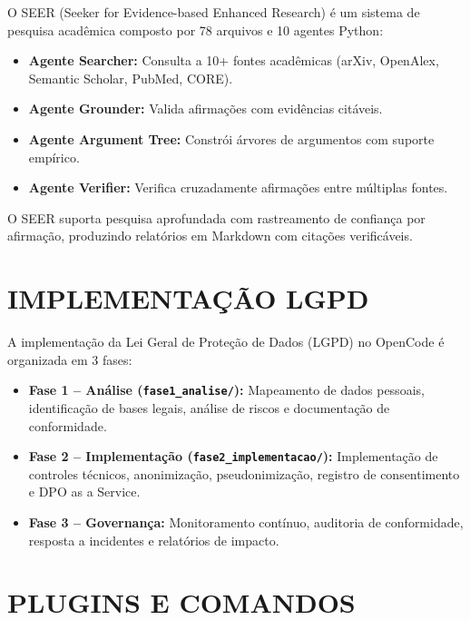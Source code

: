 \documentclass[
  brazil,
  sumario=tradicional,
  10pt
]{abntex2}
\begin{document}
O SEER (Seeker for Evidence-based Enhanced Research) é um sistema
de pesquisa acadêmica composto por 78 arquivos e 10 agentes Python:

\begin{itemize}
  \item \textbf{Agente Searcher:} Consulta a 10+ fontes acadêmicas
    (arXiv, OpenAlex, Semantic Scholar, PubMed, CORE).
  \item \textbf{Agente Grounder:} Valida afirmações com evidências
    citáveis.
  \item \textbf{Agente Argument Tree:} Constrói árvores de argumentos
    com suporte empírico.
  \item \textbf{Agente Verifier:} Verifica cruzadamente afirmações
    entre múltiplas fontes.
\end{itemize}

O SEER suporta pesquisa aprofundada com rastreamento de confiança
por afirmação, produzindo relatórios em Markdown com citações
verificáveis.

\section{IMPLEMENTAÇÃO LGPD}
\label{sec:lgpd}

A implementação da Lei Geral de Proteção de Dados (LGPD) no
OpenCode é organizada em 3 fases:

\begin{itemize}
  \item \textbf{Fase 1 -- Análise (\texttt{fase1\_analise/}):}
    Mapeamento de dados pessoais, identificação de bases legais,
    análise de riscos e documentação de conformidade.
  \item \textbf{Fase 2 -- Implementação (\texttt{fase2\_implementacao/}):}
    Implementação de controles técnicos, anonimização, pseudonimização,
    registro de consentimento e DPO as a Service.
  \item \textbf{Fase 3 -- Governança:} Monitoramento contínuo,
    auditoria de conformidade, resposta a incidentes e relatórios
    de impacto.
\end{itemize}

\section{PLUGINS E COMANDOS}
\label{sec:plugins}
\end{document}
